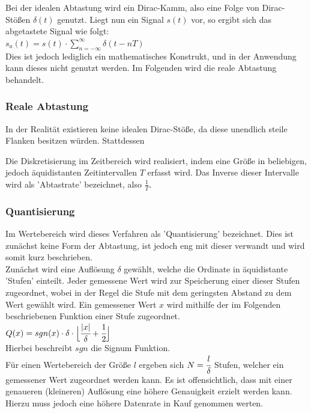 Bei der idealen Abtastung wird ein Dirac-Kamm, also eine Folge von Dirac-Stößen $\delta(t)$ genutzt. Liegt nun ein Signal $s(t)$ vor, so ergibt sich das abgetastete Signal wie folgt:\\
$s_a(t) = s(t) \cdot \sum\limits_{n=-\infty}^{\infty} \delta(t - nT)$\\
Dies ist jedoch lediglich ein mathematisches Konstrukt, und in der Anwendung kann dieses nicht genutzt werden. Im Folgenden wird die reale Abtastung behandelt.

\subsubsection{Reale Abtastung}
In der Realität existieren keine idealen Dirac-Stöße, da diese unendlich steile Flanken besitzen würden. Stattdessen 



Die Diskretisierung im Zeitbereich wird realisiert, indem eine Größe in beliebigen, jedoch äquidistanten Zeitintervallen $T$ erfasst wird. Das Inverse dieser Intervalle wird als 'Abtastrate' bezeichnet, also $\frac{1}{T}$.\\

\subsubsection{Quantisierung}
Im Wertebereich wird dieses Verfahren als 'Quantisierung' bezeichnet. Dies ist zunächst keine Form der Abtastung, ist jedoch eng mit dieser verwandt und wird somit kurz beschrieben.\\


Zunächst wird eine Auflösung $\delta$ gewählt, welche die Ordinate in äquidistante 'Stufen' einteilt. Jeder gemessene Wert wird zur Speicherung einer dieser Stufen zugeordnet, wobei in der Regel die Stufe mit dem geringsten Abstand zu dem Wert gewählt wird. Ein gemessener Wert $x$ wird mithilfe der im Folgenden beschriebenen Funktion einer Stufe zugeordnet.\\
$Q(x) = sgn(x) \cdot \delta \cdot \Big\lfloor \cfrac{|x|}{\delta} + \cfrac{1}{2} \Big\rfloor $\\
Hierbei beschreibt $sgn$ die Signum Funktion.\\
Für einen Wertebereich der Größe $l$ ergeben sich $N = \cfrac{l}{\delta}$ Stufen, welcher ein gemessener Wert zugeordnet werden kann. Es ist offensichtlich, dass mit einer genaueren (kleineren) Auflösung eine höhere Genauigkeit erzielt werden kann. Hierzu muss jedoch eine höhere Datenrate in Kauf genommen werten.



